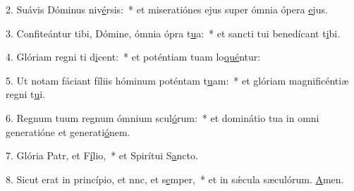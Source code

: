 2. Suávis Dóminus niv\uline{é}rsis:~* et miseratiónes ejus super ómnia ópera \uline{e}jus.\par 
3. Confiteántur tibi, Dómine, ómnia ópra t\uline{u}a:~* et sancti tui benedícant t\uline{i}bi.\par 
4. Glóriam regni ti d\uline{i}cent:~* et poténtiam tuam lo\uline{qué}ntur:\par 
5. Ut notam fáciant fíliis hóminum poténtam t\uline{u}am:~* et glóriam magnificéntiæ regni t\uline{u}i.\par 
6. Regnum tuum regnum ómnium scul\uline{ó}rum:~* et dominátio tua in omni generatióne et generati\uline{ó}nem.\par 
7. Glória Patr, et F\uline{í}lio,~* et Spirítui S\uline{a}ncto.\par 
8. Sicut erat in princípio, et nnc, et s\uline{e}mper,~* et in sǽcula sæculórum. \uline{A}men.\par 
